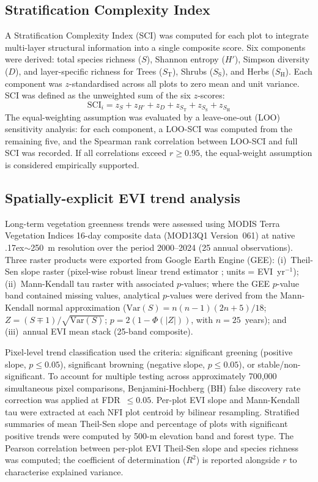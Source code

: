 \documentclass[review,12pt,a4paper]{elsarticle}
\begin{document}
\subsection{Stratification Complexity Index}
\label{sec:sci}

A Stratification Complexity Index (SCI) was computed for each plot to
integrate multi-layer structural information into a single composite score.
Six components were derived: total species richness ($S$), Shannon entropy
($H'$), Simpson diversity ($D$), and layer-specific richness for Trees
($S_\text{T}$), Shrubs ($S_\text{S}$), and Herbs ($S_\text{H}$). Each
component was $z$-standardised across all plots to zero mean and unit
variance. SCI was defined as the unweighted sum of the six $z$-scores:
\begin{equation}
  \text{SCI}_i = z_S + z_{H'} + z_D + z_{S_\text{T}} + z_{S_\text{S}} + z_{S_\text{H}}
  \label{eq:sci}
\end{equation}
The equal-weighting assumption was evaluated by a leave-one-out (LOO)
sensitivity analysis: for each component, a LOO-SCI was computed from the
remaining five, and the Spearman rank correlation between LOO-SCI and full SCI
was recorded. If all correlations exceed $r \geq 0.95$, the equal-weight
assumption is considered empirically supported.

\subsection{Spatially-explicit EVI trend analysis}
\label{sec:evi}

Long-term vegetation greenness trends were assessed using MODIS Terra
Vegetation Indices 16-day composite data (MOD13Q1 Version~061) at native
{\raise.17ex\hbox{$\scriptstyle\sim$}}250~m resolution over the period 2000--2024 (25 annual observations). Three
raster products were exported from Google Earth Engine (GEE):
(i)~Theil-Sen slope raster (pixel-wise robust linear trend estimator
\citep{sen1968}; units = EVI~yr$^{-1}$);
(ii)~Mann-Kendall tau raster with associated $p$-values; where the GEE
$p$-value band contained missing values, analytical $p$-values were derived
from the Mann-Kendall normal approximation
($\text{Var}(S) = n(n-1)(2n+5)/18$;
$Z = (S \mp 1)/\sqrt{\text{Var}(S)}$;
$p = 2(1-\Phi(|Z|))$, with $n = 25$~years); and
(iii)~annual EVI mean stack (25-band composite).

Pixel-level trend classification used the criteria: significant greening
(positive slope, $p \leq 0.05$), significant browning (negative slope,
$p \leq 0.05$), or stable/non-significant. To account for multiple testing
across approximately 700{,}000 simultaneous pixel comparisons,
Benjamini-Hochberg (BH) false discovery rate correction
\citep{benjamini1995} was applied at FDR~$\leq 0.05$. Per-plot EVI slope
and Mann-Kendall tau were extracted at each NFI plot centroid by bilinear
resampling. Stratified summaries of mean Theil-Sen slope and percentage of
plots with significant positive trends were computed by 500-m elevation band
and forest type. The Pearson correlation between per-plot EVI Theil-Sen slope
and species richness was computed; the coefficient of determination ($R^2$) is
reported alongside $r$ to characterise explained variance.
\end{document}
